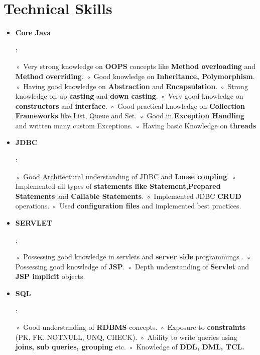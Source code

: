 \documentclass[letterpaper,11pt]{article}
\makeatletter
\newcommand{\resumeItem}[2]{
  \item\small{
    \textbf{#1}{: #2 \vspace{-2pt}}
  }
}
\newcommand{\resumeSubheading}[4]{
  \vspace{-1pt}\item
    \begin{tabular*}{0.97\textwidth}[t]{l@{\extracolsep{\fill}}r}
      \textbf{#1} & #2 \\
      \textit{\small#3} & \textit{\small #4} \\
    \end{tabular*}\vspace{-5pt}
}
\newcommand{\resumeSubItem}[2]{\resumeItem{#1}{#2}\vspace{-4pt}}
\newcommand{\resumeSubHeadingListStart}{\begin{itemize}[leftmargin=*]}
\newcommand{\resumeSubHeadingListEnd}{\end{itemize}}
\newcommand{\resumeItemListStart}{\begin{itemize}}
\newcommand{\resumeItemListEnd}{\end{itemize}\vspace{-5pt}}
\makeatother
\begin{document}



\section{Technical Skills}
\resumeSubHeadingListStart

  \resumeSubItem{Core Java}
    {

    ◦ Very strong knowledge on \textbf{OOPS} concepts like \textbf{Method overloading} and \textbf{Method overriding}.
    ◦ Good knowledge on \textbf{Inheritance, Polymorphism}.
    ◦ Having good knowledge on \textbf{Abstraction} and \textbf{Encapsulation}.
    ◦ Strong knowledge on up \textbf{casting} and \textbf{down casting}.
    ◦ Very good knowledge on \textbf{constructors} and \textbf{interface}.
    ◦ Good practical knowledge on \textbf{Collection Frameworks} like List, Queue and Set.
    ◦ Good in \textbf{Exception Handling} and written many custom Exceptions.
    ◦ Having basic Knowledge on \textbf{threads}
    }     

  \resumeSubItem{JDBC}
    {

      ◦ Good Architectural understanding of JDBC and \textbf{Loose coupling}.
      ◦ Implemented all types of \textbf{statements like Statement,Prepared Statements}  and \textbf{Callable Statements}.
      ◦ Implemented JDBC \textbf{CRUD} operations.
      ◦ Used \textbf{configuration files} and implemented best practices.

    }
  \resumeSubItem{SERVLET}
    {

      ◦ Possessing good knowledge in servlets and \textbf{server side} programmings .
      ◦ Possessing good knowledge of \textbf{JSP}.
      ◦ Depth understanding of \textbf{Servlet} and \textbf{JSP implicit} objects.

    }
  \resumeSubItem{SQL}
    {

      ◦ Good understanding of \textbf{RDBMS} concepts.
      ◦ Exposure to \textbf{constraints} (PK, FK, NOTNULL, UNQ, CHECK).
      ◦ Ability to write queries using \textbf{joins, sub queries, grouping} etc.
      ◦ Knowledge of \textbf{DDL, DML, TCL.}

    }
    \resumeSubHeadingListEnd
\end{document}

